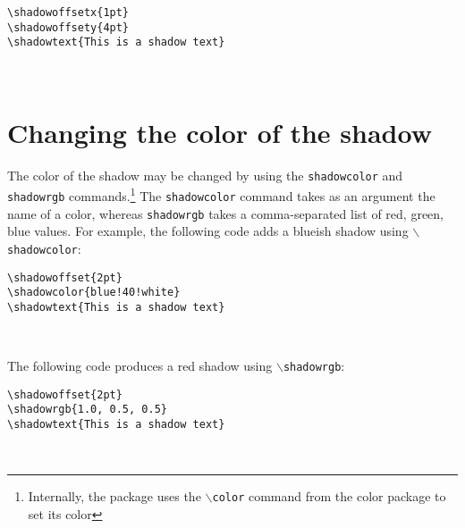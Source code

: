 \documentclass{article}
\begin{document}
\begin{minipage}{\textwidth}
\begin{multicols*}{2} 
{\footnotesize
\begin{verbatim}
\shadowoffsetx{1pt}
\shadowoffsety{4pt}
\shadowtext{This is a shadow text}
\end{verbatim}}

\shadowoffsetx{1pt}
\shadowoffsety{4pt}
\\
\phantom{}
\end{multicols*}
\end{minipage}

\section{Changing the color of the shadow}
The color of the shadow may be changed by using the {\tt shadowcolor} and {\tt shadowrgb} commands.\footnote{Internally, the 
package uses the {\tt $\backslash$color} command from the color package to set its color} 
The {\tt shadowcolor} command takes as an argument the name of a color, whereas {\tt shadowrgb} takes a comma-separated list of red, green, blue
values. For example, the following code adds a blueish shadow using {\tt $\backslash$shadowcolor}:

\begin{minipage}{\textwidth}
\begin{multicols*}{2} 
{\footnotesize
\begin{verbatim}
\shadowoffset{2pt}
\shadowcolor{blue!40!white}
\shadowtext{This is a shadow text}
\end{verbatim}}

\shadowoffset{2pt}
\\
\phantom{}
\end{multicols*}
\end{minipage}

The following code produces a red shadow using {\tt $\backslash$shadowrgb}:

\begin{minipage}{\textwidth}
\begin{multicols*}{2} 
{\footnotesize
\begin{verbatim}
\shadowoffset{2pt}
\shadowrgb{1.0, 0.5, 0.5}
\shadowtext{This is a shadow text}
\end{verbatim}}

\shadowoffset{2pt}
\\
\phantom{}
\end{multicols*}
\end{minipage}
\end{document}
